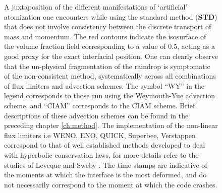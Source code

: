 \begin{figure}
\begin{center}
\end{center}
\vspace*{-0.5cm}
\caption{A juxtaposition of the different manifestations of  
`artificial' atomization one encounters while using the standard 
method (\textbf{STD}) that does not involve consistency between the discrete transport of mass and momentum. 
The red contours indicate the isosurface of the volume fraction 
field corresponding to a value of $0.5$, acting as a good proxy for the exact interfacial position. 
One can clearly observe that the un-physical fragmentation of the raindrop is symptomatic 
of the non-consistent method, systematically across all combinations of flux limiters and advection schemes. 
The symbol ``WY'' in the legend corresponds to those run using 
the Weymouth-Yue advection scheme, and ``CIAM'' corresponds to the CIAM scheme. 
Brief descriptions of these advection schemes can be found in the preceding chapter \ref{ch:method}.
The implementation of the non-linear flux limiters i.e WENO, ENO, QUICK, Superbee, Verstappen 
correspond to that of well established methods developed to 
deal with hyperbolic conservation laws, for more details refer to the
studies of Leveque \cite{flim_1} and Sweby \cite{flim_2}.
The time stamps are indicative of the moments at which the interface
is the most deformed, and do not necessarily correspond to the moment
at which the code crashes.} 
\label{explode_all}
\end{figure}

